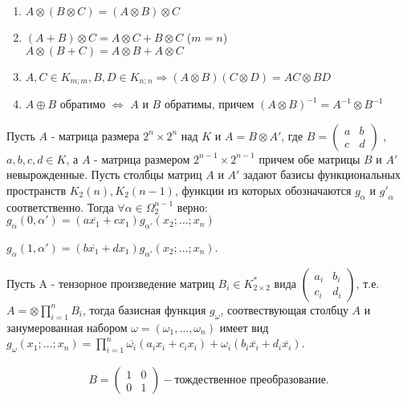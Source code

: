 \utv
\begin{enumerate}
    \item $A \otimes (B \otimes C) = (A \otimes B) \otimes C$
    \item $(A + B) \otimes C = A \otimes C + B \otimes C $ ($m = n$) \\
          $A \otimes (B + C) = A \otimes B + A \otimes C $
    \item $A,C  \in K_{m;m}, B,D \in K_{n;n} \Rightarrow (A \otimes B)(C \otimes D) = AC \otimes BD$
    \item $A \oplus B$ обратимо $\Leftrightarrow$ $A$ и $B$ обратимы, причем $(A \otimes B)^{-1} = A^{-1} \otimes B^{-1}$
\end{enumerate}

\lem Пусть $A$ - матрица размера $2^n \times 2^n$ над $K$ и $A = B \otimes A'$, где $B = \begin{pmatrix}
    a & b\\
    c & d
\end{pmatrix}$
, $a,b,c,d \in K$, а $A$ - матрица размером $2^{n-1} \times 2^{n-1}$ причем обе матрицы $B$ и  $A'$ невырожденные.
Пусть столбцы матриц $A$ и $A'$ задают базисы функциональных пространств $K_2(n), K_2(n-1)$, функции из которых обозначаются $g_\alpha$ и ${g'}_\alpha$ соответственно.
Тогда $\forall \alpha \in \Omega_2^{n-1}$ верно:\\

$g_\alpha(0, \alpha') = (a \overline{x_1} + c x_1)g_{\alpha'}(x_2; \dots ;x_n)$\par
$g_\alpha(1, \alpha') = (b \overline{x_1} + d x_1)g_{\alpha'}(x_2; \dots ;x_n)$.

\thr Пусть A - тензорное произведение матриц $B_i \in K_{2\times2}^*$ вида $\begin{pmatrix}
    a_i & b_i\\
    c_i & d_i
\end{pmatrix}$,
т.е. $A = \otimes \prod_{i = 1}^n B_i$, тогда базисная функция $g_\omega$, соотвествующая столбцу $A$ и занумерованная набором $\omega = (\omega_1, \dots, \omega_n)$ имеет вид
$g_\omega(x_1; \dots; x_n) = \prod_{i=1}^n \overline{\omega_i}(a_ix_i + c_ix_i) + \omega_i(b_i\overline{x_i} + d_i\overline{x_i})$.

\example
\begin{align*}
    B = 
    \begin{pmatrix}
        1 & 0\\
        0 & 1
    \end{pmatrix}
    - \text{тождественное преобразование}.
\end{align*}

